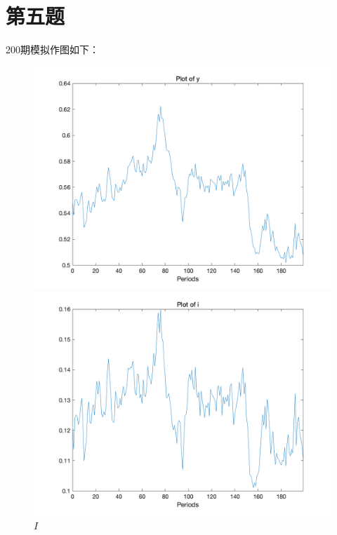 \documentclass[a4paper,12pt]{ctexart}
\begin{document}
\section*{第五题}
200期模拟作图如下：
\begin{figure}[H]
    \begin{minipage}{0.48\linewidth}
        \includegraphics[width=\linewidth]{img/figure3.png}
        \caption{$Y$}
    \end{minipage}
    \begin{minipage}{0.48\linewidth}
        \includegraphics[width=\linewidth]{img/figure4.png}
        \caption{$I$}
    \end{minipage}
\end{figure}
\end{document}
